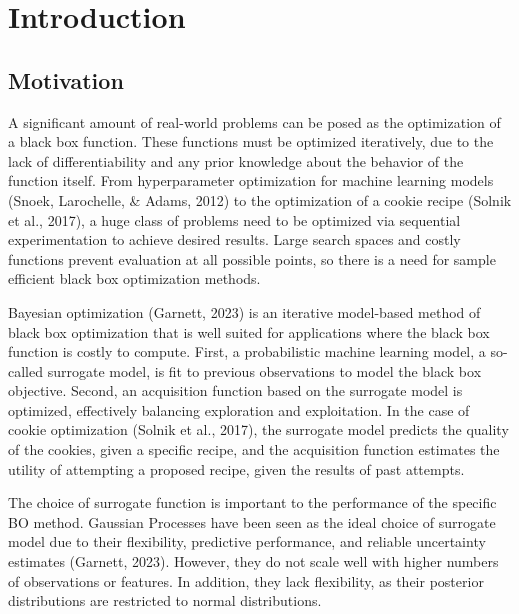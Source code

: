 \documentclass[12pt,twoside]{reedthesis}
\begin{document}
  \hypersetup{linkcolor=black}
  \setcounter{secnumdepth}{2}
  \setcounter{tocdepth}{2}
  \tableofcontents

% 
% 

\mainmatter %
\pagestyle{fancyplain} %

\hypertarget{introduction}{%
\chapter{Introduction}\label{introduction}}

\hypertarget{motivation}{%
\section{Motivation}\label{motivation}}

A significant amount of real-world problems can be posed as the optimization of a black box function. These functions must be optimized iteratively, due to the lack of differentiability and any prior knowledge about the behavior of the function itself. From hyperparameter optimization for machine learning models (Snoek, Larochelle, \& Adams, 2012) to the optimization of a cookie recipe (Solnik et al., 2017), a huge class of problems need to be optimized via sequential experimentation to achieve desired results. Large search spaces and costly functions prevent evaluation at all possible points, so there is a need for sample efficient black box optimization methods.

Bayesian optimization (Garnett, 2023) is an iterative model-based method of black box optimization that is well suited for applications where the black box function is costly to compute. First, a probabilistic machine learning model, a so-called surrogate model, is fit to previous observations to model the black box objective. Second, an acquisition function based on the surrogate model is optimized, effectively balancing exploration and exploitation. In the case of cookie optimization (Solnik et al., 2017), the surrogate model predicts the quality of the cookies, given a specific recipe, and the acquisition function estimates the utility of attempting a proposed recipe, given the results of past attempts.

The choice of surrogate function is important to the performance of the specific BO method. Gaussian Processes have been seen as the ideal choice of surrogate model due to their flexibility, predictive performance, and reliable uncertainty estimates (Garnett, 2023). However, they do not scale well with higher numbers of observations or features. In addition, they lack flexibility, as their posterior distributions are restricted to normal distributions.
\end{document}
